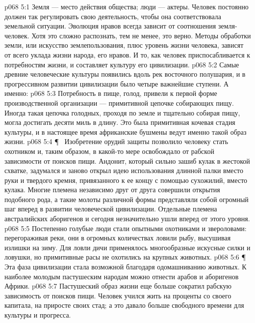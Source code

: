 \vs p068 5:1 Земля --- место действия общества; люди --- актеры. Человек постоянно должен так регулировать свою деятельность, чтобы она соответствовала земельной ситуации. Эволюция нравов всегда зависит от соотношения земля\hyp{}человек. Хотя это сложно распознать, тем не менее, это верно. Методы обработки земли, или искусство землепользования, плюс уровень жизни человека, зависят от всего уклада жизни народа, его нравов. И то, как человек приспосабливается к потребностям жизни, и составляет культуру его цивилизации.
\vs p068 5:2 Самые древние человеческие культуры появились вдоль рек восточного полушария, и в прогрессивном развитии цивилизации было четыре важнейшие ступени. А именно:
\vs p068 5:3 \bibnobreakspace {} Потребность в пище, голод, привели к первой форме производственной организации --- примитивной цепочке собирающих пищу. Иногда такая цепочка голодных, проходя по земле и тщательно собирая пищу, могла достигать десяти миль в длину. Это была примитивная кочевая стадия культуры, и в настоящее время африканские бушмены ведут именно такой образ жизни.
\vs p068 5:4 \P\ \bibnobreakspace {} Изобретение орудий защиты позволило человеку стать охотником и, таким образом, в какой\hyp{}то мере освобождало от рабской зависимости от поисков пищи. Андонит, который сильно зашиб кулак в жестокой схватке, задумался и заново открыл идею использования длинной палки вместо руки и твердого кремня, привязанного к ее концу с помощью сухожилий, вместо кулака. Многие племена независимо друг от друга совершили открытия подобного рода, а такие молоты различной формы представляли собой огромный шаг вперед в развитии человеческой цивилизации. Отдельные племена австралийских аборигенов и сегодня незначительно ушли вперед от этого уровня.
\vs p068 5:5 Постепенно голубые люди стали опытными охотниками и звероловами: перегораживая реки, они в огромных количествах ловили рыбу, высушивая излишки на зиму. Для ловли дичи применялось многообразные искусные силки и ловушки, но примитивные расы не охотились на крупных животных.
\vs p068 5:6 \P\ \bibnobreakspace {} Эта фаза цивилизации стала возможной благодаря одомашниванию животных. К наиболее молодым пастушеским народам можно отнести арабов и аборигенов Африки.
\vs p068 5:7 Пастушеский образ жизни еще больше сократил рабскую зависимость от поисков пищи. Человек учился жить на проценты со своего капитала, на приросте своих стад; а это давало больше свободного времени для культуры и прогресса.
